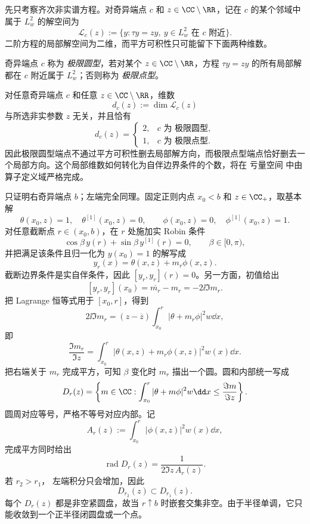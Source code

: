 先只考察齐次非实谱方程。对奇异端点 $c$ 和 $z\in\CC\setminus\RR$，记在 $c$ 的某个邻域中属于 $L^2_w$ 的解空间为
\[
 \mathcal L_c(z):=
 \{y:\tau y=zy,\ y\in L^2_w\text{ 在 }c\text{ 附近}\}.
\]
二阶方程的局部解空间为二维，而平方可积性只可能留下下面两种维数。

\begin{definition}
奇异端点 $c$ 称为 \emph{极限圆型}，若对某个 $z\in\CC\setminus\RR$，方程 $\tau y=zy$ 的所有局部解都在 $c$ 附近属于 $L^2_w$；否则称为 \emph{极限点型}。
\end{definition}

\begin{theorem}\label{thm:math-sl-weyl-alternative}
对任意奇异端点 $c$ 和任意 $z\in\CC\setminus\RR$，维数
\[
 d_c(z):=\dim \mathcal L_c(z)
\]
与所选非实参数 $z$ 无关，并且恰有
\[
 d_c(z)=
 \begin{cases}
 2,&c\text{ 为 极限圆型},\\
 1,&c\text{ 为 极限点型}.
 \end{cases}
\]
因此极限圆型端点不通过平方可积性删去局部解方向，而极限点型端点恰好删去一个局部方向。这个局部维数如何转化为自伴边界条件的个数，将在 亏量空间 中由算子定义域严格完成。
\end{theorem}

只证明右奇异端点 $b$；左端完全同理。固定正则内点 $x_0<b$ 和 $z\in\CC_+$，取基本解
\[
 \theta(x_0,z)=1,\quad \theta^{[1]}(x_0,z)=0,
 \qquad
 \phi(x_0,z)=0,\quad \phi^{[1]}(x_0,z)=1.
\]
对任意截断点 $r\in(x_0,b)$，在 $r$ 处施加实 Robin 条件
\[
 \cos\beta\,y(r)+\sin\beta\,y^{[1]}(r)=0,
 \qquad \beta\in[0,\pi),
\]
并把满足该条件且归一化为 $y(x_0)=1$ 的解写成
\[
 y_r(x)=\theta(x,z)+m_r\phi(x,z).
\]
截断边界条件是实自伴条件，因此 $[y_r,y_r](r)=0$。另一方面，初值给出
\[
 [y_r,y_r](x_0)=\overline{m_r}-m_r=-2\ii\Im m_r.
\]
把 Lagrange 恒等式用于 $[x_0,r]$，得到
\[
 2\ii\Im m_r
 =(z-\overline z)\int_{x_0}^r
 |\theta+m_r\phi|^2w\dd x,
\]
即
\begin{equation*}\frac{\Im m_r}{\Im z}
 =\int_{x_0}^r|\theta(x,z)+m_r\phi(x,z)|^2w(x)\dd x.
\end{equation*}
把右端关于 $m_r$ 完成平方，可知 $\beta$ 变化时 $m_r$ 描出一个圆。圆和内部统一写成
\begin{equation}\label{eq:math-sl-weyl-disk-inequality}
 D_r(z)=\left\{m\in\CC:
 \int_{x_0}^r|\theta+m\phi|^2w\dd x
 \le \frac{\Im m}{\Im z}\right\}.
\end{equation}
圆周对应等号，严格不等号对应内部。记
\[
 A_r(z):=\int_{x_0}^r|\phi(x,z)|^2w(x)\dd x,
\]
完成平方同时给出
\[
 \operatorname{rad}D_r(z)=\frac{1}{2\Im z\,A_r(z)}.
\]
若 $r_2>r_1$， 左端积分只会增加，因此
\[
 D_{r_2}(z)\subset D_{r_1}(z).
\]
每个 $D_r(z)$ 都是非空紧圆盘，故当 $r\uparrow b$ 时嵌套交集非空。由于半径单调，它只能收敛到一个正半径闭圆盘或一个点。

